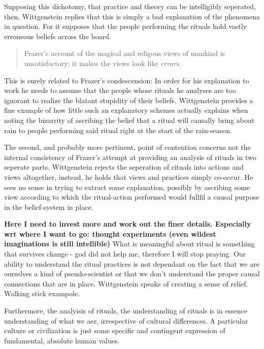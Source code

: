 \documentclass{article}
\begin{document}
Supposing this dichotomy, that practice and theory can be intelligibly seperated, then, Wittgenstein replies that this is simply a bad explanation of the phenomena in question. For it supposes that the people performing the rituals hold vastly erroneous beliefs across the board.
\begin{quote}
Frazer's account of the magical and religous views of mankind is unsatisfactory: it makes the views look like \textit{errors}.
\end{quote} 
This is surely related to Frazer's condescension: In order for his explanation to work he needs to assume that the people whose rituals he analyses are too ignorant to realize the blatant stupidity of their beliefs. Wittgenstein provides a fine example of how little such an explanatory schemes actually explains when noting the bizarrity of ascribing the belief that a ritual will causally bring about rain to people performing said ritual right at the start of the rain-season.

The second, and probably more pertinent, point of contention concerns not the internal consistency of Frazer's attempt at providing an analysis of rituals in two seperate parts. Wittgenstein rejects the seperation of rituals into actions and views altogether, instead, he holds that views and practices simply co-occur. He sees no sense in trying to extract some explanation, possibly by ascribing some view according to which the ritual-action performed would fullfil a causal purpose in the belief-system in place.

\textbf{Here I need to invest more and work out the finer details. Especially wrt where I want to go: thought experiments (even wildest imaginations is still intellible)}
What is meaningful about ritual is something that survives change - god did not help me, therefore I will stop praying. Our ability to understand the ritual practices is not dependant on the fact that we are ourselves a kind of pseudo-scientist or that we don't understand the proper causal connections that are in place. Wittgenstein speaks of creating a sense of relief. Walking stick exampole. 

Furthermore, the analyisis of rituals, the understanding of rituals is in essence understanding of what we aer, irrespective of cultural differences. A particular culture or civilization is just some specific and contingent expression of fundamental, absolute human values.
\end{document}

